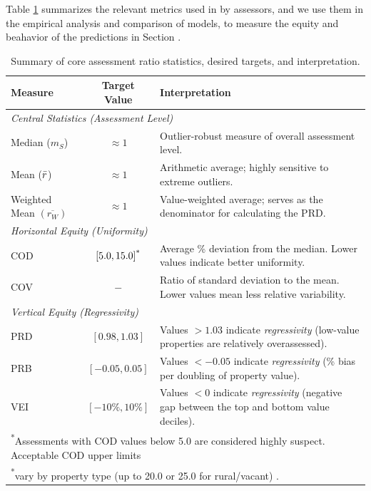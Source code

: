 \documentclass[12pt, draft]{article}
\theoremstyle{plain}
\theoremstyle{definition}
\newcommand{\1}{\mathbf{1}}
\begin{document}
{Table \ref{tab:assessment_metrics_summary} summarizes the relevant metrics used in by assessors, and we use them in the empirical analysis and comparison of models, to measure the equity and beahavior of the predictions in Section .

\begin{table}[!ht]
\centering
\caption{Summary of core assessment ratio statistics, desired targets, and interpretation.}
\label{tab:assessment_metrics_summary}
\begin{tabular}{lcp{8.5cm}}
\toprule
\textbf{Measure} & \textbf{Target Value} & \textbf{Interpretation} \\
\midrule
\multicolumn{3}{l}{\textit{{Central Statistics (Assessment Level)}}} \vspace{3mm} \\
Median ($m_S$) & \(\approx 1\) & Outlier-robust measure of overall assessment level. \\
Mean ($\Bar r$) & \(\approx 1\) & Arithmetic average; highly sensitive to extreme outliers. \\
Weighted Mean $(\overline{r_W})$ & \(\approx 1\) & Value-weighted average; serves as the denominator for calculating the PRD. \\
\midrule
\multicolumn{3}{l}{\textit{{Horizontal Equity (Uniformity)}}} \vspace{3mm}\\
COD & \([5.0, 15.0]\textsuperscript{*}\) & Average \% deviation from the median. Lower values indicate better uniformity. \\
COV & $-$ & Ratio of standard deviation to the mean. Lower values mean less relative variability. \\
\midrule
\multicolumn{3}{l}{\textit{{Vertical Equity (Regressivity)}}} \vspace{3mm}\\
PRD & \([0.98, 1.03]\) &Values \(>1.03\) indicate \textit{regressivity} (low-value properties are relatively overassessed). \\
PRB & \([-0.05, 0.05]\) & Values \(<-0.05\) indicate \textit{regressivity} (\% bias per doubling of property value). \\
VEI & \([-10\%, 10\%]\) & Values \(<0\) indicate \textit{regressivity} (negative gap between the top and bottom value deciles). \\
\bottomrule
\multicolumn{3}{l}{\footnotesize \textsuperscript{*}Assessments with COD values below 5.0 are considered highly suspect. Acceptable COD upper limits} \\
\multicolumn{3}{l}{\footnotesize  {\color{white}\textsuperscript{*}}vary by property type (up to 20.0 or 25.0 for rural/vacant) \cite{IAAO2025ExposureRatio}. } \\
\end{tabular}
\end{table}

}
\end{document}
